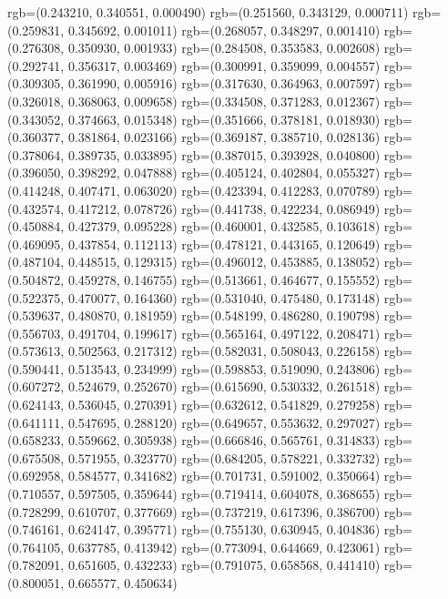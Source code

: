 {{{					rgb=(0.243210, 0.340551, 0.000490)
					rgb=(0.251560, 0.343129, 0.000711)
					rgb=(0.259831, 0.345692, 0.001011)
					rgb=(0.268057, 0.348297, 0.001410)
					rgb=(0.276308, 0.350930, 0.001933)
					rgb=(0.284508, 0.353583, 0.002608)
					rgb=(0.292741, 0.356317, 0.003469)
					rgb=(0.300991, 0.359099, 0.004557)
					rgb=(0.309305, 0.361990, 0.005916)
					rgb=(0.317630, 0.364963, 0.007597)
					rgb=(0.326018, 0.368063, 0.009658)
					rgb=(0.334508, 0.371283, 0.012367)
					rgb=(0.343052, 0.374663, 0.015348)
					rgb=(0.351666, 0.378181, 0.018930)
					rgb=(0.360377, 0.381864, 0.023166)
					rgb=(0.369187, 0.385710, 0.028136)
					rgb=(0.378064, 0.389735, 0.033895)
					rgb=(0.387015, 0.393928, 0.040800)
					rgb=(0.396050, 0.398292, 0.047888)
					rgb=(0.405124, 0.402804, 0.055327)
					rgb=(0.414248, 0.407471, 0.063020)
					rgb=(0.423394, 0.412283, 0.070789)
					rgb=(0.432574, 0.417212, 0.078726)
					rgb=(0.441738, 0.422234, 0.086949)
					rgb=(0.450884, 0.427379, 0.095228)
					rgb=(0.460001, 0.432585, 0.103618)
					rgb=(0.469095, 0.437854, 0.112113)
					rgb=(0.478121, 0.443165, 0.120649)
					rgb=(0.487104, 0.448515, 0.129315)
					rgb=(0.496012, 0.453885, 0.138052)
					rgb=(0.504872, 0.459278, 0.146755)
					rgb=(0.513661, 0.464677, 0.155552)
					rgb=(0.522375, 0.470077, 0.164360)
					rgb=(0.531040, 0.475480, 0.173148)
					rgb=(0.539637, 0.480870, 0.181959)
					rgb=(0.548199, 0.486280, 0.190798)
					rgb=(0.556703, 0.491704, 0.199617)
					rgb=(0.565164, 0.497122, 0.208471)
					rgb=(0.573613, 0.502563, 0.217312)
					rgb=(0.582031, 0.508043, 0.226158)
					rgb=(0.590441, 0.513543, 0.234999)
					rgb=(0.598853, 0.519090, 0.243806)
					rgb=(0.607272, 0.524679, 0.252670)
					rgb=(0.615690, 0.530332, 0.261518)
					rgb=(0.624143, 0.536045, 0.270391)
					rgb=(0.632612, 0.541829, 0.279258)
					rgb=(0.641111, 0.547695, 0.288120)
					rgb=(0.649657, 0.553632, 0.297027)
					rgb=(0.658233, 0.559662, 0.305938)
					rgb=(0.666846, 0.565761, 0.314833)
					rgb=(0.675508, 0.571955, 0.323770)
					rgb=(0.684205, 0.578221, 0.332732)
					rgb=(0.692958, 0.584577, 0.341682)
					rgb=(0.701731, 0.591002, 0.350664)
					rgb=(0.710557, 0.597505, 0.359644)
					rgb=(0.719414, 0.604078, 0.368655)
					rgb=(0.728299, 0.610707, 0.377669)
					rgb=(0.737219, 0.617396, 0.386700)
					rgb=(0.746161, 0.624147, 0.395771)
					rgb=(0.755130, 0.630945, 0.404836)
					rgb=(0.764105, 0.637785, 0.413942)
					rgb=(0.773094, 0.644669, 0.423061)
					rgb=(0.782091, 0.651605, 0.432233)
					rgb=(0.791075, 0.658568, 0.441410)
					rgb=(0.800051, 0.665577, 0.450634)
}}}
